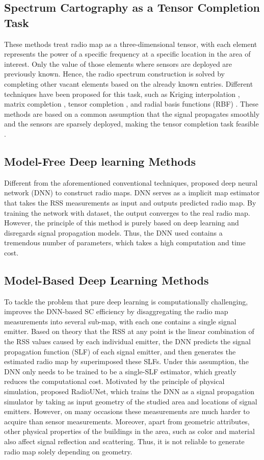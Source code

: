 \documentclass[conference]{IEEEtran}
\begin{document}
\subsection{Spectrum Cartography as a Tensor Completion Task}
These methods treat radio map as a three-dimensional tensor, with each element represents the power of a specific frequency at a specific location in the area of interest. Only the value of those elements where sensors are deployed are previously known. Hence, the radio spectrum construction is solved by completing other vacant elements based on the already known entries. Different techniques have been proposed for this task, such as Kriging interpolation \cite{b4}, matrix completion \cite{b5}, tensor completion \cite{b6}, and radial basis functions (RBF) \cite{b7} . These methods are based on a common assumption that the signal propagates smoothly and the sensors are sparsely deployed, making the tensor completion task feasible \cite{b6}\cite{b8}. 


\subsection{Model-Free Deep learning Methods}
Different from the aforementioned conventional techniques, \cite{b9} proposed deep neural network (DNN) to construct radio maps. DNN serves as a implicit map estimator that takes the RSS measurements as input and outputs predicted radio map. By training the network with dataset, the output converges to the real radio map. However, the principle of this method is purely based on deep learning and disregards signal propagation models. Thus, the DNN used contains a tremendous number of parameters, which takes a high computation and time cost. 

\subsection{Model-Based Deep Learning Methods}
To tackle the problem that pure deep learning is computationally challenging,  \cite{b10} improves the DNN-based SC efficiency by disaggregating the radio map measurements into several sub-map, with each one contains a single signal emitter. Based on theory that the RSS at any point is the linear combination of the RSS values caused by each individual emitter, the DNN predicts the signal propagation function (SLF) of each signal emitter, and then generates the estimated radio map by superimposed these SLFs. Under this assumption, the DNN only needs to be trained to be a single-SLF estimator, which greatly reduces the computational cost. Motivated by the principle of physical simulation, \cite{b3} proposed RadioUNet, which trains the DNN as a signal propagation simulator by taking as input geometry of the studied area and locations of signal emitters. However, on many occasions these measurements are much harder to acquire than sensor measurements. Moreover, apart from geometric attributes, other physical properties of the buildings in the area, such as color and material also affect signal reflection and scattering. Thus, it is not reliable to generate radio map solely depending on geometry.  
\end{document}
